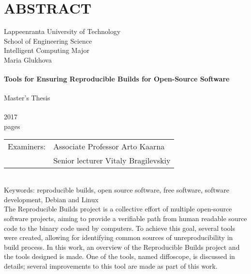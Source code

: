 \section*{ABSTRACT}

Lappeenranta University of Technology\\
School of Engineering Science\\
Intelligent Computing Major\\


Maria Glukhova\\
\\
\textbf{Tools for Ensuring Reproducible Builds for Open-Source Software}\\
\\
Master's Thesis\\
\\
2017\\
\pageref{LastPage} pages\\


\begin{tabular}{l p{11.0cm}}  
  
Examiners: & Associate Professor \foreignlanguage{finnish}{Arto Kaarna}\\
& Senior lecturer Vitaly Bragilevskiy\\

\end {tabular}\\

Keywords: reproducible builds, open source software, free software, software development, Debian and Linux\\


The Reproducible Builds project is a collective effort of multiple open-source software
projects, aiming to provide a verifiable path from human readable source code
to the binary code used by computers. To achieve this goal, several tools were
created, allowing for identifying common sources of unreproducibility in build
process.
In this work, an overview of the Reproducible Builds project and the tools designed is made. One of the tools, named diffoscope, is discussed in details; several improvements to this tool are made as part of this work.\\
